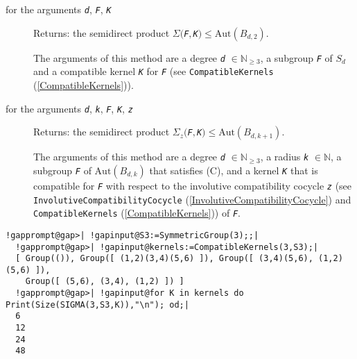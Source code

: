 \documentclass[a4paper,11pt]{report}
\begin{document}
{{{ 

 
\begin{description}
\item[{for the arguments \mbox{\texttt{\mdseries\slshape d}}, \mbox{\texttt{\mdseries\slshape F}}, \mbox{\texttt{\mdseries\slshape K}}}]  Returns: the semidirect product $\Sigma($\mbox{\texttt{\mdseries\slshape F}}$,$\mbox{\texttt{\mdseries\slshape K}}$)\le\mathrm{Aut}(B_{d,2})$. 

 The arguments of this method are a degree \mbox{\texttt{\mdseries\slshape d}} $\in\mathbb{N}_{\ge 3}$, a subgroup \mbox{\texttt{\mdseries\slshape F}} of $S_{d}$ and a compatible kernel \mbox{\texttt{\mdseries\slshape K}} for \mbox{\texttt{\mdseries\slshape F}} (see \texttt{CompatibleKernels} (\ref{CompatibleKernels})). 
\item[{for the arguments \mbox{\texttt{\mdseries\slshape d}}, \mbox{\texttt{\mdseries\slshape k}}, \mbox{\texttt{\mdseries\slshape F}}, \mbox{\texttt{\mdseries\slshape K}}, \mbox{\texttt{\mdseries\slshape z}}}]  Returns: the semidirect product $\Sigma_{z}($\mbox{\texttt{\mdseries\slshape F}}$,$\mbox{\texttt{\mdseries\slshape K}}$)\le\mathrm{Aut}(B_{d,k+1})$. 

 The arguments of this method are a degree \mbox{\texttt{\mdseries\slshape d}} $\in\mathbb{N}_{\ge 3}$, a radius \mbox{\texttt{\mdseries\slshape k}} $\in\mathbb{N}$, a subgroup \mbox{\texttt{\mdseries\slshape F}} of $\mathrm{Aut}(B_{d,k})$ that satisfies (C), and a kernel \mbox{\texttt{\mdseries\slshape K}} that is compatible for \mbox{\texttt{\mdseries\slshape F}} with respect to the involutive compatibility cocycle \mbox{\texttt{\mdseries\slshape z}} (see \texttt{InvolutiveCompatibilityCocycle} (\ref{InvolutiveCompatibilityCocycle}) and \texttt{CompatibleKernels} (\ref{CompatibleKernels})) of \mbox{\texttt{\mdseries\slshape F}}. 
\end{description}
 

 }

 

 
\begin{Verbatim}[commandchars=!@|,fontsize=\small,frame=single,label=Example]
  !gapprompt@gap>| !gapinput@S3:=SymmetricGroup(3);;|
  !gapprompt@gap>| !gapinput@kernels:=CompatibleKernels(3,S3);|
  [ Group(()), Group([ (1,2)(3,4)(5,6) ]), Group([ (3,4)(5,6), (1,2)(5,6) ]), 
    Group([ (5,6), (3,4), (1,2) ]) ]
  !gapprompt@gap>| !gapinput@for K in kernels do Print(Size(SIGMA(3,S3,K)),"\n"); od;|
  6
  12
  24
  48
\end{Verbatim}
 

}}
\end{document}
